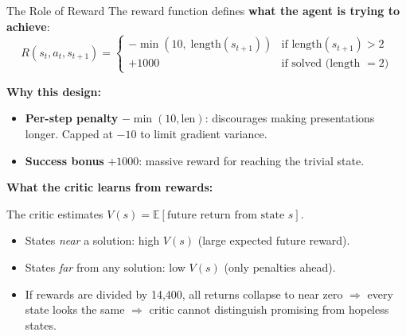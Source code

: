 \documentclass[aspectratio=169,11pt]{beamer}
\begin{document}
\begin{frame}{The Role of Reward}
  \small
  The reward function defines \textbf{what the agent is trying to achieve}:
  \[
    R(s_t, a_t, s_{t+1}) = \begin{cases}
      -\min(10,\; \mathrm{length}(s_{t+1})) & \text{if } \mathrm{length}(s_{t+1}) > 2 \\[3pt]
      +1000 & \text{if solved (length $= 2$)}
    \end{cases}
  \]
  \vspace{-6pt}

  \textbf{Why this design:}
  \begin{itemize}\setlength\itemsep{1pt}
    \item \textbf{Per-step penalty} $-\min(10, \text{len})$: discourages making
      presentations longer.  Capped at $-10$ to limit gradient variance.
    \item \textbf{Success bonus} $+1000$: massive reward for reaching the trivial state.
  \end{itemize}

  \medskip
  \textbf{What the critic learns from rewards:}

  \smallskip
  The critic estimates $V(s) = \mathbb{E}[\text{future return from state } s]$.
  \begin{itemize}\setlength\itemsep{1pt}
    \item States \emph{near} a solution: high $V(s)$ (large expected future reward).
    \item States \emph{far} from any solution: low $V(s)$ (only penalties ahead).
    \item \alert{If rewards are divided by 14{,}400}, all returns collapse to near zero
      $\Rightarrow$ every state looks the same $\Rightarrow$ critic cannot distinguish
      promising from hopeless states.
  \end{itemize}
\end{frame}
\end{document}
